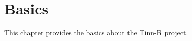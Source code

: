 
\renewcommand{\subsubsection} {\textsl{ }\\ }


\hypertarget{basic}{}
\chapter{Basics}

This chapter provides the basics about the Tinn-R project.

\newpage

\newpage

\newpage


